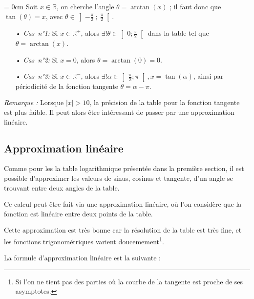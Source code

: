 \documentclass[a4paper]{article}
\begin{document}
					\vspace{2 mm}

					{\parindent = 0cm Soit $x \in \mathbb{R}$, on cherche l'angle $\theta = \arctan(x)$ ; il faut donc que $\tan(\theta) = x$, 
					avec $\theta \in \left]-\frac{\pi}{2}~;~\frac{\pi}{2}\right[$.}

					\vspace{2 mm}

					\begin{itemize}
						\item [•] \emph{Cas~n°1:} Si $x \in \mathbb{R}^+$, alors $\exists! \theta \in \left]0;\frac{\pi}{2}\right[$ dans la table tel que $\theta = \arctan(x)$.
						\vspace{2 mm}
						\item [•] \emph{Cas~n°2:} Si $x = 0$, alors $\theta = \arctan(0) = 0$.
						\vspace{2 mm}
						\item [•] \emph{Cas~n°3:} Si $x \in \mathbb{R}^-$, alors $\exists! \alpha \in \left]\frac{\pi}{2};\pi\right[, x = \tan(\alpha)$, ainsi par périodicité de la fonction tangente $\theta = \alpha - \pi$.
					\end{itemize}

					\vspace{2 mm}

					\emph{Remarque :} Lorsque $|x| > 10$, la précision de la table pour la fonction tangente est plus faible. 
					Il peut alors être intéressant de passer par une approximation linéaire.
		
		\subsection{Approximation linéaire}

			Comme pour les la table logarithmique présentée dans la première section,
			il est possible d'approximer les valeurs de sinus, cosinus et tangente,
			d'un angle se trouvant entre deux angles de la table.

			Ce calcul peut être fait via une approximation linéaire,
			où l'on considère que la fonction est linéaire entre deux points de la table.

			Cette approximation est très bonne car la résolution de la table est très fine,
			et les fonctions trigonométriques varient doucemement\footnote{Si l'on ne tient pas des parties où la courbe de la tangente est proche de ses asymptotes.}.

			La formule d'approximation linéaire est la suivante :
\end{document}
